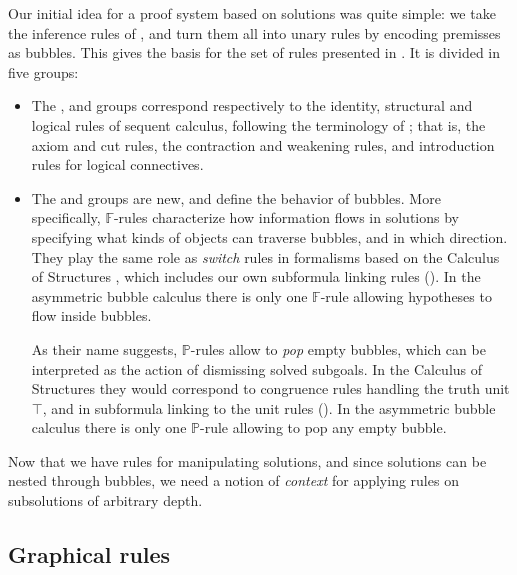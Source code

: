 Our initial idea for a proof system based on solutions was quite simple: we take
the inference rules of , and turn them all into unary rules by encoding
premisses as bubbles. This gives the basis for the set of rules presented in
. It is divided in five groups:
\begin{itemize}
  \item The {\identity}, {\resource} and {\heating} groups correspond
  respectively to the identity, structural and logical rules of sequent
  calculus, following the terminology of ; that
  is, the axiom and cut rules, the contraction and weakening rules, and
  introduction rules for logical connectives.
  \item The {\flow} and {\popping} groups are new, and define the behavior of
  bubbles.
  More specifically, $\mathbb{F}$-rules characterize how information flows in
  solutions by specifying what kinds of objects can traverse bubbles, and in
  which direction. They play the same role as \emph{switch} rules in formalisms
  based on the Calculus of Structures \cite{Guglielmi1999ACO}, which includes
  our own subformula linking rules (). In the asymmetric bubble
  calculus there is only one $\mathbb{F}$-rule {} allowing
  hypotheses to flow inside bubbles.
  
  As their name suggests, $\mathbb{P}$-rules allow to \emph{pop} empty bubbles,
  which can be interpreted as the action of dismissing solved subgoals. In the
  Calculus of Structures they would correspond to congruence rules handling the
  truth unit $\top$, and in subformula linking to the unit rules
  (). In the asymmetric bubble calculus there is only one
  $\mathbb{P}$-rule {} allowing to pop any empty bubble.
\end{itemize}

Now that we have rules for manipulating solutions, and since solutions can be
nested through bubbles, we need a notion of \emph{context} for applying rules on
subsolutions of arbitrary depth.


\subsection{Graphical rules}



